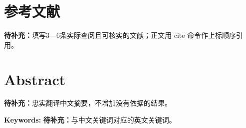 \documentclass[UTF8,a4paper,11pt,fontset=fandol,scheme=plain]{ctexart}
\newcommand{\ReportTODO}[1]{\textbf{待补充：}#1}
\begin{document}
\section{参考文献}
\ReportTODO{填写3—6条实际查阅且可核实的文献；正文用 cite 命令作上标顺序引用。}

\section*{Abstract}
\ReportTODO{忠实翻译中文摘要，不增加没有依据的结果。}
\par\noindent\textbf{Keywords: }\ReportTODO{与中文关键词对应的英文关键词。}

\end{document}
